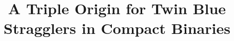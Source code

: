 \documentclass{aastex62}
\begin{document}
\title{A Triple Origin for Twin Blue Stragglers in Compact Binaries}


\end{document}
